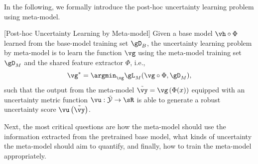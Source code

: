 
In the following, we formally introduce the post-hoc uncertainty learning problem using meta-model.
\begin{problem}\label{prob:general}[Post-hoc Uncertainty Learning by Meta-model] Given a base model $\vh \circ \Phi$ learned from the base-model training set $\gD_B$, the uncertainty learning problem by meta-model is to learn the function $\vg$ using the meta-model training set $\gD_M$ and the shared feature extractor $\Phi$, i.e.,
\begin{equation}
\vg^* = \argmin_{\vg} \gL_M(\vg \circ \Phi,\gD_M),
\end{equation}
such that the output from the meta-model $\tilde{\vy} = \vg\left(\Phi(x)\right)$ equipped with an uncertainty metric function $\vu : \mathcal{\tilde{Y}} \rightarrow \sR$ is able to generate a robust uncertainty score $\vu\left(\tilde{\vy}\right)$.
\end{problem}

Next, the most critical questions are how the meta-model should use the information extracted from the pretrained base model, what kinds of uncertainty the meta-model should aim to quantify, and finally, how to train the meta-model appropriately. 





